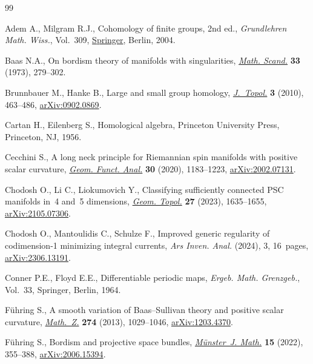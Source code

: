 \begin{thebibliography}{99}
\footnotesize\itemsep=0pt

Adem A., Milgram R.J., Cohomology of finite groups, 2nd ed., \textit{Grundlehren Math.
 Wiss.}, Vol.~309, \href{https://doi.org/10.1007/978-3-662-06280-7}{Springer}, Berlin, 2004.

Baas N.A., On bordism theory of manifolds with singularities, \href{https://doi.org/10.7146/math.scand.a-11491}{\textit{Math.
 Scand.}} \textbf{33} (1973), 279--302.

Brunnbauer M., Hanke B., Large and small group homology, \href{https://doi.org/10.1112/jtopol/jtq014}{\textit{J.~Topol.}}
 \textbf{3} (2010), 463--486, \href{https://arxiv.org/abs/0902.0869}{arXiv:0902.0869}.

Cartan H., Eilenberg S., Homological algebra, Princeton University Press,
 Princeton, NJ, 1956.

Cecchini S., A long neck principle for {R}iemannian spin manifolds with
 positive scalar curvature, \href{https://doi.org/10.1007/s00039-020-00545-1}{\textit{Geom. Funct. Anal.}} \textbf{30} (2020),
 1183--1223, \href{https://arxiv.org/abs/2002.07131}{arXiv:2002.07131}.

Chodosh O., Li C., Liokumovich Y., Classifying sufficiently connected {PSC}
 manifolds in~4 and~5 dimensions,  \href{https://doi.org/10.2140/gt.2023.27.1635}{\textit{Geom. Topol.}} \textbf{27} (2023),
 1635--1655, \href{https://arxiv.org/abs/2105.07306}{arXiv:2105.07306}.

Chodosh O., Mantoulidis C., Schulze F., Improved generic regularity of
 codimension-1 minimizing integral currents, \textit{Ars Inven. Anal.}
 (2024), 3, 16~pages, \href{https://arxiv.org/abs/2306.13191}{arXiv:2306.13191}.

Conner P.E., Floyd E.E., Differentiable periodic maps, \textit{Ergeb. Math.
 Grenzgeb.}, Vol.~33, Springer, Berlin, 1964.

F\"uhring S., A smooth variation of {B}aas--{S}ullivan theory and positive
 scalar curvature, \href{https://doi.org/10.1007/s00209-012-1105-x}{\textit{Math.~Z.}} \textbf{274} (2013), 1029--1046,
 \href{https://arxiv.org/abs/1203.4370}{arXiv:1203.4370}.

F\"uhring S., Bordism and projective space bundles, \href{https://doi.org/10.17879/21089690084}{\textit{M\"unster~J. Math.}}
 \textbf{15} (2022), 355--388, \href{https://arxiv.org/abs/2006.15394}{arXiv:2006.15394}.


\end{thebibliography}
